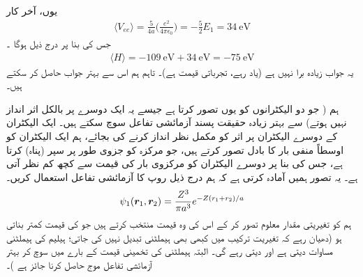   یوں، آخر کار
\begin{align}\label{مساوات_تغیریتی_مخفیہ_توقعاتی_قیمت}
\langle V_{ee} \rangle=\frac{5}{4a}\big(\frac{e^{2}}{4\pi\epsilon_{0}}\big)=-\frac{5}{2}E_{1}=\SI{34}{\electronvolt} 
\end{align}
 جس کی بنا پر درج ذیل ہوگا ۔
\begin{align}
\langle H \rangle =\SI{-109}{\electronvolt}+\SI{34}{\electronvolt}=\SI{-75}{\electronvolt} 
\end{align}
یہ جواب زیادہ برا نہیں ہے (یاد رہے،  تجرباتی قیمت   ہے)۔ تاہم ہم اس سے  بہتر جواب حاصل  کر سکتے ہیں۔

ہم ( جو دو الیکٹرانوں کو یوں تصور کرتا ہے جیسے یہ  ایک دوسرے پر  بالکل اثر انداز نہیں ہوتے)  سے بہتر زیادہ حقیقت پسند   آزمائشی  تفاعل  سوچ سکتے ہیں۔ ایک الیکٹران کے  دوسرے الیکٹران پر اثر کو مکمل   نظر انداز کرنے کی بجائے،  ہم  ایک الیکٹران   کو اوسطاً  منفی بار کا بادل   تصور کرتے ہیں،  جو مرکزہ کو جزوی طور پر  سپر (پناہ)   کرتا ہے،  جس کی بنا پر دوسرے الیکٹران کو   مرکزوی بار  کی قیمت   سے کچھ کم نظر آتی ہے۔ یہ تصور  ہمیں   آمادہ کرتی ہے   کہ ہم  درج ذیل روپ کا آزمائشی  تفاعل استعمال کریں۔
\begin{align}\label{مساوات_تغیریت_آزمائشی_سپر}
\psi_{1}({{\boldsymbol{r}}}_{1},{{\boldsymbol{r}}}_{2})=\frac{Z^{3}}{\pi a^{3}}e^{-Z(r_{1}+r_{2})/a} 
\end{align}
 ہم   کو تغیریتی  مقدار معلوم تصور کر کے اس کی وہ قیمت منتخب کرتے ہیں  جو   کی  قیمت کمتر بناتی ہو (دھیان رہے کہ  تغیریت  ترکیب  میں کبھی بھی ہیملٹنی  تبدیل نہیں کی جاتی؛  ہیلیم کی ہیملٹنی  مساوات    دیتی ہے اور دیتی رہے گی۔  البتہ  ہیملٹنی کی تخمینی قیمت کے بارے میں سوچ کر بہتر آزمائشی  تفاعل موج حاصل کرنا جائز ہے )۔
 
